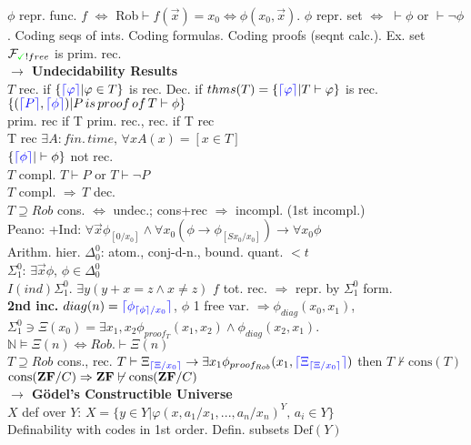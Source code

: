 \documentclass[9pt]{article}
\newcommand{\class}[1]{{\bf #1}}
\newcommand{\code}[1]{{\color{blue}\lceil#1\rceil}}
\newcommand{\mytitle}[1]{ {\bf $\rightarrow$ #1}\\}
\newcommand{\Def}{\mbox{Def}}
\begin{document}
\begin{multicols*}{2}
$\phi$ repr. func. $f$ $\Leftrightarrow$ Rob$\vdash f(\vec{x})=x_0\Leftrightarrow\phi(x_0,\vec{x})$. $\phi$ repr. set $\Leftrightarrow$ $\vdash\phi$ or $\vdash\neg\phi$. Coding seqs of ints. Coding formulas. Coding proofs (seqnt calc.). Ex. set $\mathcal{F}_{{\color{green}\checkmark}!free}$ is prim. rec.\\
\mytitle{Undecidability Results}
$T$ rec. if $\{\code{\varphi}|\varphi\in T\}$ is rec. Dec. if $thms(T)=\{\code{\varphi}|T\vdash\varphi\}$ is rec.\\
$\{(\code{P},\code{\phi})|P\,is\,proof\,of\,T\vdash\phi\}$\\
prim. rec if T prim. rec., rec. if T rec\\
T rec $\exists A\colon fin.\,time,\,\forall x A(x)=[x\in T]$\\
$\{\code{\phi}|\vdash\phi\}$ not rec.\\
$T$ compl. $T\vdash P$ or $T\vdash \neg P$\\
$T$ compl. $\Rightarrow\,T$ dec.\\
$T\supseteq Rob$ cons. $\Leftrightarrow$ undec.; cons+rec $\Rightarrow$ incompl. (1st incompl.)\\
Peano: +Ind: $\forall \vec{x}\phi_{[0/x_0]}\wedge\forall x_0(\phi\to \phi_{[Sx_0/x_0]})\to\forall x_0\phi$\\
Arithm. hier.
$\Delta_0^0$: atom., conj-d-n., bound. quant. $<t$\\
$\Sigma_1^0$: $\exists\vec{x}\phi$, $\phi\in\Delta_0^0$\\
$I(ind)\Sigma_1^0$. $\exists y(y+x=z\wedge x\neq z)$
$f$ tot. rec. $\Rightarrow$ repr. by $\Sigma_1^0$ form.\\
{\bf 2nd inc.} $diag(n)=\code{\phi_{\code{\phi}/x_0}}$, $\phi$ 1 free var. $\Rightarrow \phi_{diag}(x_0,x_1)$, $\Sigma_1^0\ni\Xi(x_0)=\exists x_1,x_2 \phi_{proof_T}(x_1, x_2)\wedge\phi_{diag}(x_2,x_1)$. $\mathbb{N}\models \Xi(n)\Leftrightarrow Rob.\vdash \Xi(n)$\\
$T\supseteq Rob$ cons., rec. $T\vdash \Xi_{\code{\Xi/x_0}}\to\exists x_1 \phi_{proof_{Rob}}(x_1, \code{\Xi_{\code{\Xi/x_0}}})$ then $T\not\vdash \mbox{cons}(T)$\\
$\mbox{cons}(\class{ZF}/C)\Rightarrow \class{ZF}\not\vdash \mbox{cons}(\class{ZF}/C)$\\
\mytitle{G\"odel's Constructible Universe}
$X$ def over $Y$: $X=\{y\in Y|\varphi(x,a_1/x_1,...,a_n/x_n)^Y,\,a_i\in Y\}$\\
Definability with codes in 1st order. Defin. subsets $\Def(Y)$\\

\end{multicols*}
\end{document}
